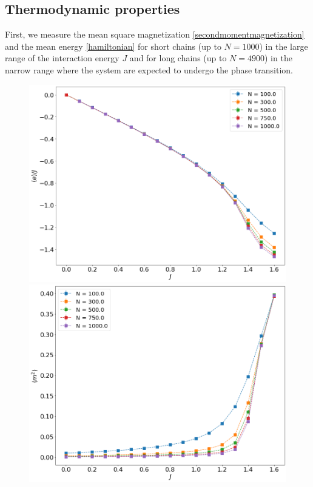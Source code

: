 \subsection{Thermodynamic properties}
First, we measure the mean square magnetization \eqref{secondmomentmagnetization} and the mean energy \eqref{hamiltonian} for short chains (up to $N=1000$) in the large range of the interaction energy $J$ and for long chains (up to $N=4900$) in the narrow range where the system are expected to undergo the phase transition.

 \begin{figure}[!ht]
	\centering
	\includegraphics[scale=0.23]{Images/energy_shortchains.png}
	\includegraphics[scale=0.23]{Images/magnetization2_shortchains.png} \\

\end{figure}
